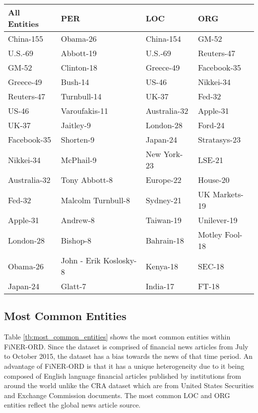 \documentclass[11pt]{article}
\begin{document}
\begin{table*}[ht]
\centering
\footnotesize
\begin{tabular}{p{}p{}p{}p{}}
\hline
\textbf{All Entities} & \textbf{PER}& \textbf{LOC}& \textbf{ORG}\\
\hline
   China-155 &               Obama-26 &        China-154 &          GM-52 \\
    U.S.-69 &              Abbott-19 &         U.S.-69 &     Reuters-47 \\
       GM-52 &             Clinton-18 &        Greece-49 &    Facebook-35 \\
   Greece-49 &                Bush-14 &            US-46 &      Nikkei-34 \\
  Reuters-47 &            Turnbull-14 &            UK-37 &         Fed-32 \\
       US-46 &          Varoufakis-11 &     Australia-32 &       Apple-31 \\
       UK-37 &              Jaitley-9 &        London-28 &        Ford-24 \\
 Facebook-35 &              Shorten-9 &         Japan-24 &   Stratasys-23 \\
   Nikkei-34 &              McPhail-9 &      New York-23 &         LSE-21 \\
Australia-32 &          Tony Abbott-8 &        Europe-22 &       House-20 \\
      Fed-32 &     Malcolm Turnbull-8 &        Sydney-21 &  UK Markets-19 \\
    Apple-31 &               Andrew-8 &        Taiwan-19 &    Unilever-19 \\
   London-28 &               Bishop-8 &       Bahrain-18 & Motley Fool-18 \\
    Obama-26 & John - Erik Koslosky-8 &         Kenya-18 &         SEC-18 \\
    Japan-24 &                Glatt-7 &         India-17 &          FT-18 \\
\hline
\end{tabular}
\caption{Most common entities in FiNER-ORD.}
\label{tb:most_common_entities}
\end{table*}

\subsection{Most Common Entities}

 Table \ref{tb:most_common_entities} shows the most common entities within FiNER-ORD. Since the dataset is comprised of financial news articles from July to October 2015, the dataset has a bias towards the news of that time period. An advantage of FiNER-ORD is that it has a unique heterogeneity due to it being composed of English language financial articles published by institutions from around the world unlike the CRA dataset which are from United States Securities and Exchange Commission documents. The most common LOC and ORG entities reflect the global news article source.
 
\end{document}
